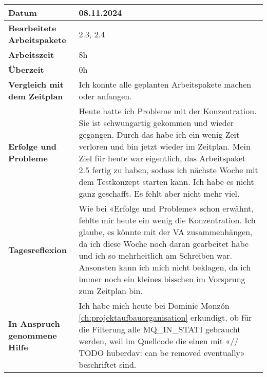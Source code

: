 \begin{longtable}{p{}|p{}}
	\hline
	\textbf{Datum}                       & 08.11.2024            \\
	\hline
	\textbf{Bearbeitete Arbeitspakete}   & 2.3, 2.4                  \\
	\hline
	\textbf{Arbeitszeit}                 & 8h                                    \\
	\hline
	\textbf{Überzeit}                    & 0h                                    \\
	\hline
	\textbf{Vergleich mit dem Zeitplan}  & Ich konnte alle geplanten Arbeitspakete machen oder anfangen.  \\
	\hline
	\textbf{Erfolge und Probleme} & Heute hatte ich Probleme mit der Konzentration. Sie ist schwungartig gekommen und wieder gegangen. Durch das habe ich ein wenig Zeit verloren und bin jetzt wieder im Zeitplan. Mein Ziel für heute war eigentlich, das Arbeitspaket 2.5 fertig zu haben, sodass ich nächste Woche mit dem Testkonzept starten kann. Ich habe es nicht ganz geschafft. Es fehlt aber nicht mehr viel.
	\\
	\hline
	\textbf{Tagesreflexion} & Wie bei «Erfolge und Probleme» schon erwähnt, fehlte mir heute ein wenig die Konzentration. Ich glaube, es könnte mit der VA zusammenhängen, da ich diese Woche noch daran gearbeitet habe und ich so mehrheitlich am Schreiben war. Ansonsten kann ich mich nicht beklagen, da ich immer noch ein kleines bisschen im Vorsprung zum Zeitplan bin.
	\\
	\hline
	\textbf{In Anspruch genommene Hilfe} & Ich habe mich heute bei Dominic Monzón \ref{ch:projektaufbauorganisation} erkundigt, ob für die Filterung alle MQ\_IN\_STATI gebraucht werden, weil im Quellcode die einen mit «// TODO huberdav: can be removed eventually» beschriftet sind.                                \\
	\hline
\end{longtable}\label{tab:arbeitsprotokoll-08.11.2024}
\newpage

